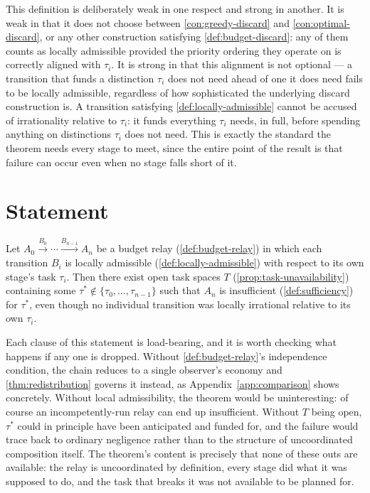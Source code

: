 This definition is deliberately weak in one respect and strong in
another. It is weak in that it does not choose between
\cref{con:greedy-discard} and \cref{con:optimal-discard}, or any other
construction satisfying \cref{def:budget-discard}: any of them counts as
locally admissible provided the priority ordering they operate on is
correctly aligned with $\tau_i$. It is strong in that this alignment is
not optional --- a transition that funds a distinction $\tau_i$ does not
need ahead of one it does need fails to be locally admissible, regardless
of how sophisticated the underlying discard construction is. A transition
satisfying \cref{def:locally-admissible} cannot be accused of
irrationality relative to $\tau_i$: it funds everything $\tau_i$ needs, in
full, before spending anything on distinctions $\tau_i$ does not need.
This is exactly the standard the theorem needs every stage to meet, since
the entire point of the result is that failure can occur even when no
stage falls short of it.

\section{Statement}

\begin{theorem}
\label{thm:composition-failure}
Let $A_0 \xrightarrow{B_0} \cdots \xrightarrow{B_{n-1}} A_n$ be a budget
relay (\cref{def:budget-relay}) in which each transition $B_i$ is locally
admissible (\cref{def:locally-admissible}) with respect to its own
stage's task $\tau_i$. Then there exist open task spaces $T$
(\cref{prop:task-unavailability}) containing some $\tau^* \notin \{\tau_0,
\ldots, \tau_{n-1}\}$ such that $A_n$ is insufficient
(\cref{def:sufficiency}) for $\tau^*$, even though no individual
transition was locally irrational relative to its own $\tau_i$.
\end{theorem}

Each clause of this statement is load-bearing, and it is worth checking
what happens if any one is dropped. Without \cref{def:budget-relay}'s
independence condition, the chain reduces to a single observer's economy
and \cref{thm:redistribution} governs it instead, as
Appendix~\ref{app:comparison} shows concretely. Without local
admissibility, the theorem would be uninteresting: of course an
incompetently-run relay can end up insufficient. Without $T$ being open,
$\tau^*$ could in principle have been anticipated and funded for, and the
failure would trace back to ordinary negligence rather than to the
structure of uncoordinated composition itself. The theorem's content is
precisely that none of these outs are available: the relay is
uncoordinated by definition, every stage did what it was supposed to do,
and the task that breaks it was not available to be planned for.

